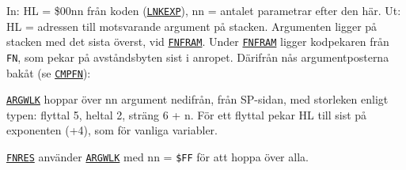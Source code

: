 \begin{Listing}
\begin{Note}\par\noindent In: HL = \$00nn från koden (\hyperlink{l:LNKEXP}{\texttt{LNKEXP}}), nn = antalet parametrar efter den här. Ut: HL = adressen till motsvarande argument på stacken. Argumenten ligger på stacken med det sista överst, vid \hyperlink{v:FNFRAM}{\texttt{FNFRAM}}. Under \hyperlink{v:FNFRAM}{\texttt{FNFRAM}} ligger kodpekaren från \texttt{FN}, som pekar på avståndsbyten sist i anropet. Därifrån nås argumentposterna bakåt (se \hyperlink{l:CMPFN}{\texttt{CMPFN}}):\par
\begin{Verb}
\end{Verb}
\par\noindent \hyperlink{l:ARGWLK}{\texttt{ARGWLK}} hoppar över nn argument nedifrån, från SP-sidan, med storleken enligt typen: flyttal 5, heltal 2, sträng 6 + n. För ett flyttal pekar HL till sist på exponenten (+4), som för vanliga variabler.\par
\par\noindent \hyperlink{l:FNRES}{\texttt{FNRES}} använder \hyperlink{l:ARGWLK}{\texttt{ARGWLK}} med nn = \texttt{\$FF} för att hoppa över alla.\par\end{Note}

\end{Listing}
